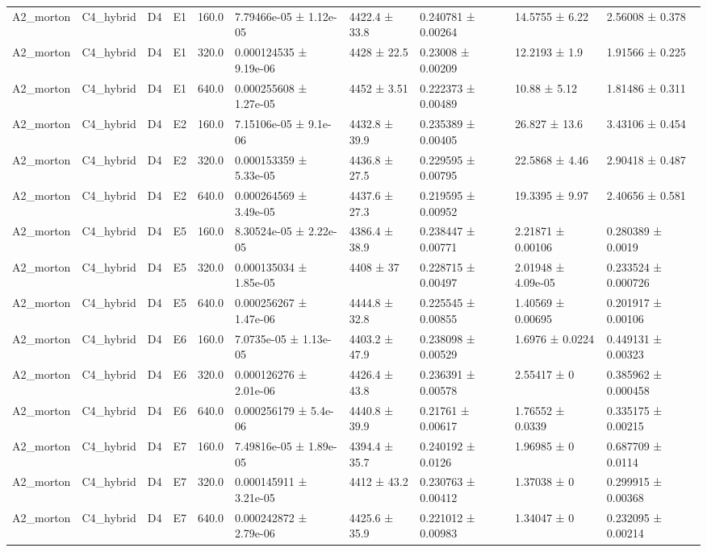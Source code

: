\begin{table}
\begin{tabular}{llllllllll}
A2\_morton & C4\_hybrid & D4 & E1 & 160.0 & 7.79466e-05 ± 1.12e-05 & 4422.4 ± 33.8 & 0.240781 ± 0.00264 & 14.5755 ± 6.22 & 2.56008 ± 0.378 \\
A2\_morton & C4\_hybrid & D4 & E1 & 320.0 & 0.000124535 ± 9.19e-06 & 4428 ± 22.5 & 0.23008 ± 0.00209 & 12.2193 ± 1.9 & 1.91566 ± 0.225 \\
A2\_morton & C4\_hybrid & D4 & E1 & 640.0 & 0.000255608 ± 1.27e-05 & 4452 ± 3.51 & 0.222373 ± 0.00489 & 10.88 ± 5.12 & 1.81486 ± 0.311 \\
A2\_morton & C4\_hybrid & D4 & E2 & 160.0 & 7.15106e-05 ± 9.1e-06 & 4432.8 ± 39.9 & 0.235389 ± 0.00405 & 26.827 ± 13.6 & 3.43106 ± 0.454 \\
A2\_morton & C4\_hybrid & D4 & E2 & 320.0 & 0.000153359 ± 5.33e-05 & 4436.8 ± 27.5 & 0.229595 ± 0.00795 & 22.5868 ± 4.46 & 2.90418 ± 0.487 \\
A2\_morton & C4\_hybrid & D4 & E2 & 640.0 & 0.000264569 ± 3.49e-05 & 4437.6 ± 27.3 & 0.219595 ± 0.00952 & 19.3395 ± 9.97 & 2.40656 ± 0.581 \\
A2\_morton & C4\_hybrid & D4 & E5 & 160.0 & 8.30524e-05 ± 2.22e-05 & 4386.4 ± 38.9 & 0.238447 ± 0.00771 & 2.21871 ± 0.00106 & 0.280389 ± 0.0019 \\
A2\_morton & C4\_hybrid & D4 & E5 & 320.0 & 0.000135034 ± 1.85e-05 & 4408 ± 37 & 0.228715 ± 0.00497 & 2.01948 ± 4.09e-05 & 0.233524 ± 0.000726 \\
A2\_morton & C4\_hybrid & D4 & E5 & 640.0 & 0.000256267 ± 1.47e-06 & 4444.8 ± 32.8 & 0.225545 ± 0.00855 & 1.40569 ± 0.00695 & 0.201917 ± 0.00106 \\
A2\_morton & C4\_hybrid & D4 & E6 & 160.0 & 7.0735e-05 ± 1.13e-05 & 4403.2 ± 47.9 & 0.238098 ± 0.00529 & 1.6976 ± 0.0224 & 0.449131 ± 0.00323 \\
A2\_morton & C4\_hybrid & D4 & E6 & 320.0 & 0.000126276 ± 2.01e-06 & 4426.4 ± 43.8 & 0.236391 ± 0.00578 & 2.55417 ± 0 & 0.385962 ± 0.000458 \\
A2\_morton & C4\_hybrid & D4 & E6 & 640.0 & 0.000256179 ± 5.4e-06 & 4440.8 ± 39.9 & 0.21761 ± 0.00617 & 1.76552 ± 0.0339 & 0.335175 ± 0.00215 \\
A2\_morton & C4\_hybrid & D4 & E7 & 160.0 & 7.49816e-05 ± 1.89e-05 & 4394.4 ± 35.7 & 0.240192 ± 0.0126 & 1.96985 ± 0 & 0.687709 ± 0.0114 \\
A2\_morton & C4\_hybrid & D4 & E7 & 320.0 & 0.000145911 ± 3.21e-05 & 4412 ± 43.2 & 0.230763 ± 0.00412 & 1.37038 ± 0 & 0.299915 ± 0.00368 \\
A2\_morton & C4\_hybrid & D4 & E7 & 640.0 & 0.000242872 ± 2.79e-06 & 4425.6 ± 35.9 & 0.221012 ± 0.00983 & 1.34047 ± 0 & 0.232095 ± 0.00214 \\

\end{tabular}
\end{table}
